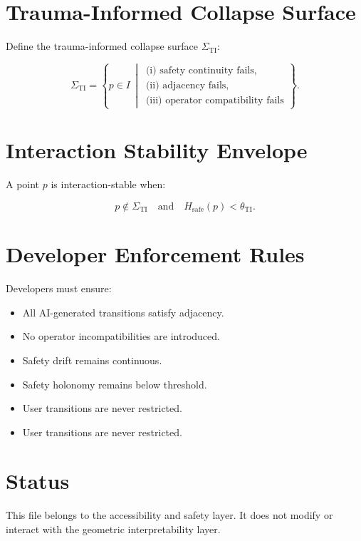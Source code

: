 \documentclass[11pt]{article}
\begin{document}
\section{Trauma-Informed Collapse Surface}

Define the trauma-informed collapse surface $\Sigma_{\mathrm{TI}}$:

\[
\Sigma_{\mathrm{TI}}
  = \left\{
      p \in I \,\middle|\,
      \begin{array}{l}
        \text{(i) safety continuity fails,} \\
        \text{(ii) adjacency fails,} \\
        \text{(iii) operator compatibility fails}
      \end{array}
    \right\}.
\]

\section{Interaction Stability Envelope}

A point $p$ is interaction-stable when:

\[
p \notin \Sigma_{\mathrm{TI}}
\quad\text{and}\quad
H_{\mathrm{safe}}(p) < \theta_{\mathrm{TI}}.
\]

\section{Developer Enforcement Rules}

Developers must ensure:

\begin{itemize}
  \item All AI-generated transitions satisfy adjacency.
  \item No operator incompatibilities are introduced.
  \item Safety drift remains continuous.
  \item Safety holonomy remains below threshold.
  \item User transitions are never restricted.
  \item User transitions are never restricted.
\end{itemize}

\section{Status}

This file belongs to the accessibility and safety layer. It does not modify or
interact with the geometric interpretability layer.
\end{document}
